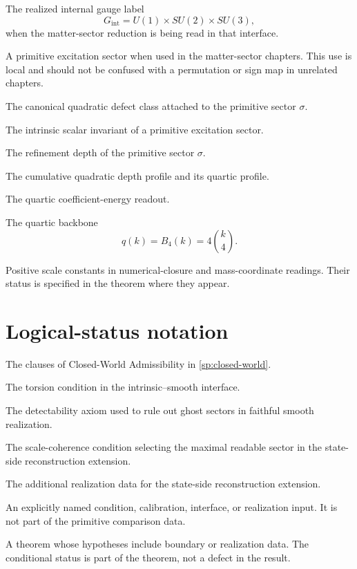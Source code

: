 \begin{description}[leftmargin=3.6cm,style=nextline]
The realized internal gauge label
\[
        G_{\mathrm{int}}=U(1)\times SU(2)\times SU(3),
\]
when the matter-sector reduction is being read in that interface.
\item[\(\sigma\)]
A primitive excitation sector when used in the matter-sector chapters.
This use is local and should not be confused with a permutation or sign
map in unrelated chapters.
\item[\(\kappa_\sigma\)]
The canonical quadratic defect class attached to the primitive sector
\(\sigma\).
\item[\(m_0(\sigma)=Q(\kappa_\sigma)\)]
The intrinsic scalar invariant of a primitive excitation sector.
\item[\(k_\sigma\)]
The refinement depth of the primitive sector \(\sigma\).
\item[\(\eta_k\), \(\omega_k\)]
The cumulative quadratic depth profile and its quartic profile.
\item[\(E_4\)]
The quartic coefficient-energy readout.
\item[\(q(k)\), \(B_4(k)\)]
The quartic backbone
\[
        q(k)=B_4(k)=4\binom{k}{4}.
\]
\item[\(\lambda\), \(\mu\)]
Positive scale constants in numerical-closure and mass-coordinate
readings.  Their status is specified in the theorem where they appear.
\end{description}

\section*{Logical-status notation}
\begin{description}[leftmargin=3.6cm,style=nextline]
\item[\textup{(SP1)--(SP5)}]
The clauses of Closed-World Admissibility in
\cref{sp:closed-world}.
\item[\textup{(T)}]
The torsion condition in the intrinsic--smooth interface.
\item[\textup{(D)}]
The detectability axiom used to rule out ghost sectors in faithful
smooth realization.
\item[\textup{(U)}]
The scale-coherence condition selecting the maximal readable sector in
the state-side reconstruction extension.
\item[\textup{(R1)--(R3)}]
The additional realization data for the state-side reconstruction
extension.
\item[Boundary datum]
An explicitly named condition, calibration, interface, or realization
input.  It is not part of the primitive comparison data.
\item[Conditional theorem]
A theorem whose hypotheses include boundary or realization data.  The
conditional status is part of the theorem, not a defect in the result.
\end{description}

